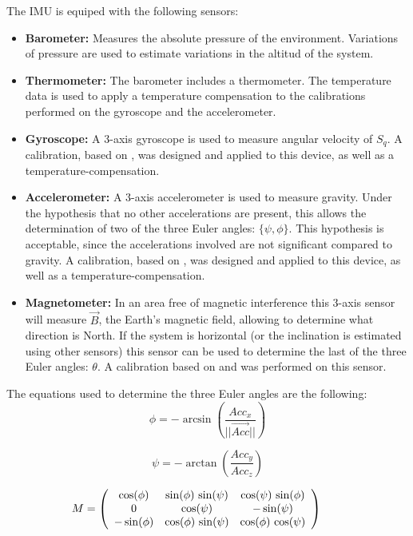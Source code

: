 \documentclass[conference]{IEEEtran}
\begin{document}
The IMU is equiped with the following sensors:
\begin{itemize}
\item \textbf{Barometer:} Measures the absolute pressure of the environment. Variations of pressure are used to estimate variations in the altitud of the system.
\item \textbf{Thermometer:} The barometer includes a thermometer. The temperature data is used to apply a temperature compensation to the calibrations performed on the gyroscope and the accelerometer.
\item \textbf{Gyroscope:} A 3-axis gyroscope is used to measure angular velocity of $S_q$. A calibration, based on \cite{bib:calib_imu}, was designed and applied to this device, as well as a temperature-compensation.
\item \textbf{Accelerometer:} A 3-axis accelerometer is used to measure gravity. Under the hypothesis that no other accelerations are present, this allows the determination of two of the three Euler angles: $\{\psi, \phi\}$. This hypothesis is acceptable, since the accelerations involved are not significant compared to gravity. A calibration, based on \cite{bib:calib_imu}, was designed and applied to this device, as well as a temperature-compensation.
\item \textbf{Magnetometer:} In an area free of magnetic interference this 3-axis sensor will measure $\vec{B}$, the Earth's magnetic field, allowing to determine what direction is North. If the system is horizontal (or the inclination is estimated using other sensors) this sensor can be used to determine the last of the three Euler angles: $\theta$. A calibration based on \cite{bib:bola} and \cite{bib:alain} was performed on this sensor.
\end{itemize}

The equations used to determine the three Euler angles are the following\cite{bib:kalman}:
  \[
  \phi = -\arcsin\left(\frac{Acc_x}{\vert\vert\vec{Acc}\vert\vert}\right)
  \]

  \[
  \psi =- \arctan \left(\frac{Acc_y}{Acc_z}\right)
  \]
      
  \[
  \hspace{-20pt}
  M = 
\left(\begin{array}{ccc} \cos\!\left(\mathrm{\phi}\right) & \sin\!\left(\mathrm{\phi}\right)\, \sin\!\left(\mathrm{\psi}\right) & \cos\!\left(\mathrm{\psi}\right)\, \sin\!\left(\mathrm{\phi}\right)\\ 0 & \cos\!\left(\mathrm{\psi}\right) & - \sin\!\left(\mathrm{\psi}\right)\\ - \sin\!\left(\mathrm{\phi}\right) & \cos\!\left(\mathrm{\phi}\right)\, \sin\!\left(\mathrm{\psi}\right) & \cos\!\left(\mathrm{\phi}\right)\, \cos\!\left(\mathrm{\psi}\right) \end{array}\right)
  \]
\end{document}
